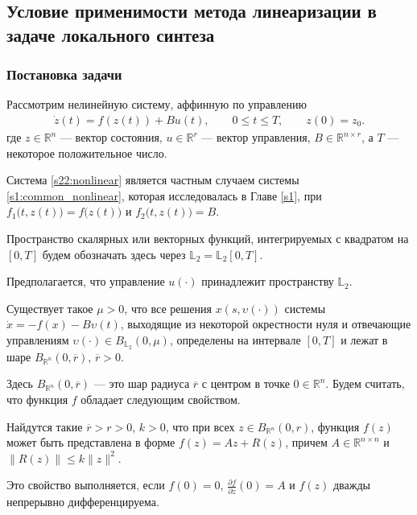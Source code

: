\documentclass[../main.tex]{subfiles}
\begin{document}
\subsection{Условие применимости метода линеаризации в задаче локального синтеза} 

\subsubsection{Постановка задачи}

Рассмотрим нелинейную систему, аффинную по управлению
\begin{gather}\label{s22:nonlinear}
 \dot{z}(t)=f(z(t))+B u(t),\qquad 0 \leqslant t \leqslant T, \qquad z(0) = z_0.
\end{gather}
 где $ z \in \mathbb{R}^n $ --- вектор состояния, $ u \in \mathbb{R}^r $ --- вектор управления, $B \in \mathbb{R}^{n \times r}$, а $ 
T$ --- некоторое положительное число. 

Система \eqref{s22:nonlinear} является частным случаем системы \eqref{s1:common_nonlinear}, которая исследовалась в Главе \ref{s1}, при $f_1\big(t,z(t)\big) = f\big(z(t)\big)$ и $f_2\big(t,z(t)\big) = B$. 

Пространство скалярных или векторных функций, интегрируемых с квадратом на $ [0,T] $ будем обозначать здесь через $ \mathbb{L}_2 = \mathbb{L}_2[0,T] $. 

Предполагается, что управление $u(\cdot)$ принадлежит пространству $\mathbb{L}_2 $.
\begin{assumption}\label{s22:as:solution_bounded}
	Существует такое $\mu > 0$, что все решения $x(s, \upsilon(\cdot))$ системы $\dot{x} = -f(x)-B\upsilon(t)$, выходящие из некоторой окрестности нуля и отвечающие управлениям $\upsilon(\cdot) \in B_{\mathbb{L}_2}(0, \mu)$, определены на интервале $[0, T]$ и лежат в шаре $ B_{\mathbb{R}^n}(0,\overline{r})$, $\overline{r} > 0$.
\end{assumption}
Здесь $ B_{\mathbb{R}^n}(0,\overline{r}) $ --- это шар радиуса $\overline{r}$ с центром в точке $0 \in \mathbb{R}^n$. 
Будем считать, что функция $f$ обладает следующим свойством.

\begin{assumption}\label{s22:as:Residial_term_bounds}
 Найдутся такие $\overline{r} > r >0$, $k>0$, что при всех $ z \in B_{\mathbb{R}^n}(0,r) $, функция $f(z)$ может быть представлена в форме $ f(z) = Az + R(z) $, причем $A \in \mathbb{R}^{n \times n}$ и $ \|R(z) \| \leqslant k \| z\|^2 $. 
\end{assumption}
Это свойство выполняется, если $f(0) = 0 $, $\frac{\partial f}{\partial z}(0) 
= A $ и $f(z)$ дважды непрерывно дифференцируема. 
\end{document}
